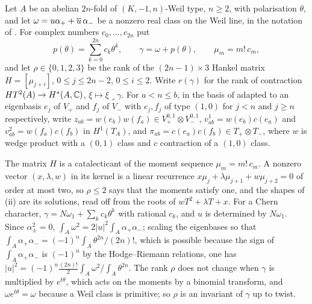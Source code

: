 \begin{setupenv}\label{setup:p2prime}
Let $A$ be an abelian $2n$-fold of $(K,-1,n)$-Weil type, $n\ge2$, with
polarisation $\theta$, and let $\omega=u\alpha_{+}+\overline{u}\,\alpha_{-}$ be a
nonzero real class on the Weil line, in the notation of .
For complex numbers $c_{0},\dots,c_{2n}$ put
\[
  p(\theta)=\sum_{k=0}^{2n}c_{k}\theta^{k},\qquad
  \gamma=\omega+p(\theta),\qquad \mu_{m}=m!\,c_{m},
\]
and let $\rho\in\{0,1,2,3\}$ be the rank of the $(2n-1)\times3$ Hankel matrix
$H=[\mu_{j+i}]$, $0\le j\le2n-2$, $0\le i\le2$. Write $r(\gamma)$ for the
rank of contraction $HT^{2}(A)\to H^{*}(A,\mathbb{C})$, $\xi\mapsto\xi\lrcorner\gamma$.
For $a<n\le b$, in the basis of  adapted to an
eigenbasis $e_{j}$ of $V_{+}$ and $f_{j}$ of $V_{-}$ with $e_{j},f_{j}$ of
type $(1,0)$ for $j<n$ and $j\ge n$ respectively, write
$z_{ab}=w(e_{b})w(f_{a})\in V_{+}^{0,1}\otimes V_{-}^{0,1}$,
$v^{1}_{ab}=w(e_{b})c(e_{a})$ and $v^{2}_{ab}=w(f_{a})c(f_{b})$ in
$H^{1}(T_{A})$, and $\pi_{ab}=c(e_{a})c(f_{b})\in T_{+}\otimes T_{-}$, where
$w$ is wedge product with a $(0,1)$ class and $c$ contraction of a $(1,0)$
class.
\end{setupenv}

The matrix $H$ is a catalecticant of the moment sequence
$\mu_{m}=m!\,c_{m}$. A nonzero vector $(x,\lambda,w)$ in its kernel is a
linear recurrence $x\mu_{j}+\lambda\mu_{j+1}+w\mu_{j+2}=0$ of order at most
two, so $\rho\le2$ says that the moments satisfy one, and the shapes of
(ii) are its solutions, read off from the roots of
$wT^{2}+\lambda T+x$. For a Chern character,
$\gamma=N\omega_{1}+\sum_{k}c_{k}\theta^{k}$ with rational $c_{k}$, and $u$
is determined by $N\omega_{1}$. Since $\alpha_{\pm}^{2}=0$,
$\int_{A}\omega^{2}=2|u|^{2}\int_{A}\alpha_{+}\alpha_{-}$; scaling the
eigenbases so that $\int_{A}\alpha_{+}\alpha_{-}=(-1)^{n}\int_{A}\theta^{2n}/(2n)!$,
which is possible because the sign of $\int_{A}\alpha_{+}\alpha_{-}$ is
$(-1)^{n}$ by the Hodge--Riemann relations, one has
$|u|^{2}=(-1)^{n}\tfrac{(2n)!}{2}\int_{A}\omega^{2}\big/\!\int_{A}\theta^{2n}$.
The rank
$\rho$ does not change when
$\gamma$ is multiplied by $e^{t\theta}$, which acts on the moments by a
binomial transform, and $\omega e^{t\theta}=\omega$ because a Weil class is
primitive; so $\rho$ is an invariant of $\gamma$ up to twist.

